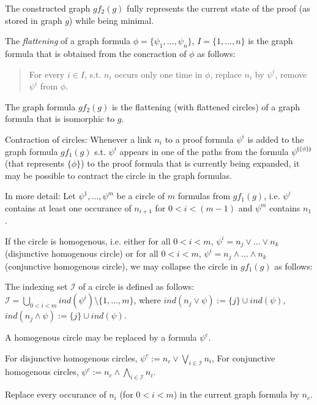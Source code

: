 \documentclass{llncs}
\newcommand{\ind}[1]{\llparenthesis #1 \rrparenthesis}
\begin{document}
The constructed graph $gf_2(g)$ fully represents the current state of the proof (as stored in graph $g$)
while being minimal.

\begin{definition}
The \emph{flattening} of a graph formula $\phi=\{\psi_1,\ldots,\psi_n\}$, $I=\{1,\ldots,n\}$ is the graph formula that is obtained from 
the concraction of $\phi$ as follows:
\begin{quote}
For every $i\in I$, s.t. $n_i$ occurs only one time in $\phi$, replace $n_i$ by $\psi^i$, remove $\psi^i$ from $\phi$.
\end{quote}

\end{definition}

\begin{example} The graph formula $gf_2(g)$ is the flattening (with flattened circles) of a graph formula that is isomorphic to $g$.
\end{example}

Contraction of circles: Whenever a link $n_i$ to a proof formula $\psi^i$ is added to the graph formula $gf_1(g)$ s.t.
$\psi^i$ appears in one of the paths from the formula $\psi^{\ind{\{\phi\}}}$ (that 
represents $\{\phi\}$) to the proof formula that is currently being expanded, it may be possible to contract the
circle in the graph formulas.

In more detail: Let $\psi^1,\ldots,\psi^m$ be a circle of $m$ formulas from $gf_1(g)$,
i.e. $\psi^i$ contains at least one occurance of $n_{i+1}$ for $0<i<(m-1)$ and $\psi^m$ contains $n_1$.

If the circle is homogenous, i.e. either for all $0<i<m$, $\psi^i=n_j\vee\ldots\vee n_k$ (disjunctive
homogenous circle) or for all $0<i<m$, $\psi^i=n_j\wedge\ldots\wedge n_k$ (conjunctive homogenous circle),
we may collapse the circle in $gf_1(g)$ as follows: 

The indexing set $\mathcal{I}$ of a circle is defined as follows: $\mathcal{I}=\bigcup\limits_{0<i<m}{ind(\psi^i)}\setminus\{1,\ldots,m\}$,
where $ind(n_j\vee\psi):=\{j\}\cup ind(\psi)$, $ind(n_j\wedge\psi):=\{j\}\cup ind(\psi)$.

A homogenous circle may be replaced by a formula $\psi^c$.

For disjunctive homogenous circles, $\psi^c:=n_c\vee\bigvee\limits_{i\in\mathcal{I}}n_i$,
For conjunctive homogenous circles, $\psi^c:=n_c\wedge\bigwedge\limits_{i\in\mathcal{I}}n_i$.

Replace every occurance of $n_i$ (for $0<i<m$) in the current graph formula by $n_c$.
\end{document}
